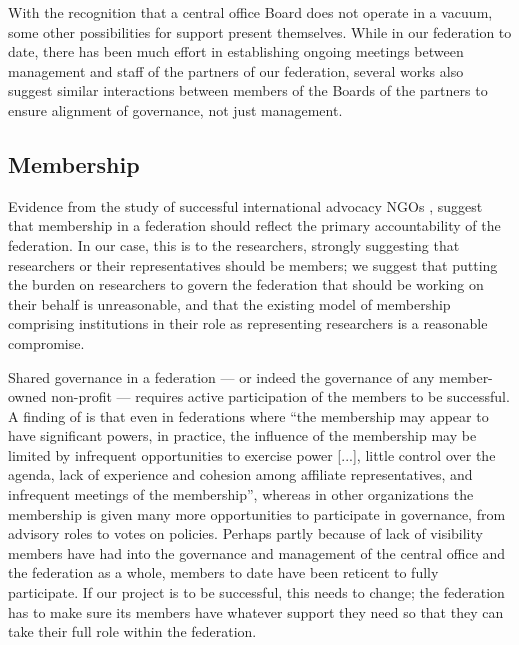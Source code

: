 \documentclass[11pt, letterpaper, twoside]{article}
\begin{document}
With the recognition that a central office Board does not operate in a
vacuum, some other possibilities for support present themselves. While
in our federation to date, there has been much effort in establishing
ongoing meetings between management and staff of the partners of our
federation, several works also suggest similar interactions between
members of the Boards of the partners to ensure alignment of governance,
not just management.

\subsection*{Membership}
%

Evidence from the study of successful international advocacy NGOs \citep{Brown20121098},
suggest that membership in a federation should reflect the primary
accountability of the federation. In our case, this is to the
researchers, strongly suggesting that researchers or their
representatives should be members; we suggest that putting the burden on
researchers to govern the federation that should be working on their
behalf is unreasonable, and that the existing model of membership
comprising institutions in their role as representing researchers is a
reasonable compromise.


Shared governance in a federation --- or indeed the governance of any
member-owned non-profit --- requires active participation of the members
to be successful. A finding of \cite{widmer1999governance} is that even
in federations where ``the membership may appear to have significant
powers, in practice, the influence of the membership may be limited by
infrequent opportunities to exercise power {[}...{]}, little control over
the agenda, lack of experience and cohesion among affiliate
representatives, and infrequent meetings of the membership'', whereas in
other organizations the membership is given many more opportunities to
participate in governance, from advisory roles to votes on policies.
Perhaps partly because of lack of visibility members have had into the
governance and management of the central office and the federation as a
whole, members to date have been reticent to fully participate. If our
project is to be successful, this needs to change; the federation has to
make sure its members have whatever support they need so that they can
take their full role within the federation.
\end{document}
